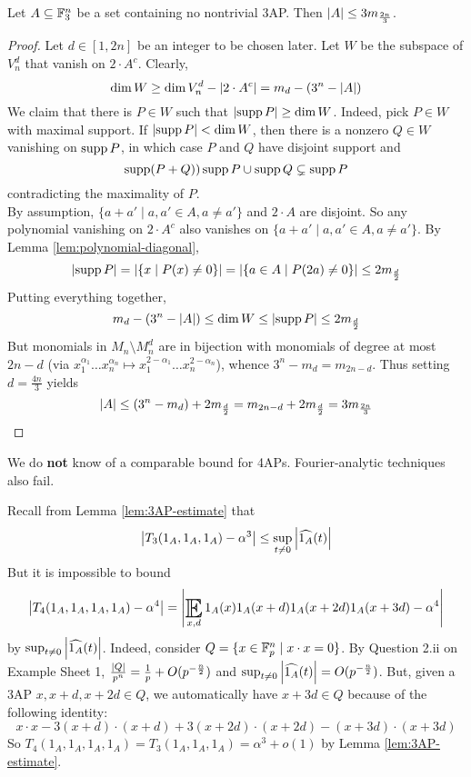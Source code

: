 \documentclass{article}
\begin{document}
\begin{prop}
  Let $A \subseteq \mathbb F_3^n$ be a set containing no nontrivial 3AP. Then $\left\lvert A\right\rvert \le 3m_{\frac{2n}3}$.
\end{prop}
\begin{proof}
  Let $d \in [1, 2n]$ be an integer to be chosen later. Let $W$ be the subspace of $V_n^d$ that vanish on $2 \cdot A^c$. Clearly,
  $$\dim W \ge \dim V_n^d - \left\lvert 2 \cdot A^c\right\rvert = m_d - (3^n - \left\lvert A\right\rvert)$$
  We claim that there is $P \in W$ such that $\left\lvert \operatorname{supp} P\right\rvert \ge \dim W$. Indeed, pick $P \in W$ with maximal support. If $\left\lvert \operatorname{supp} P\right\rvert < \dim W$, then there is a nonzero $Q \in W$ vanishing on $\operatorname{supp} P$, in which case $P$ and $Q$ have disjoint support and
  $$\operatorname{supp}(P + Q) ) \operatorname{supp} P \cup \operatorname{supp} Q \subsetneq \operatorname{supp} P$$
  contradicting the maximality of $P$. \\
  By assumption, $\{a + a' \mid a, a' \in A, a \ne a'\}$ and $2 \cdot A$ are disjoint. So any polynomial vanishing on $2 \cdot A^c$ also vanishes on $\{a + a' \mid a, a' \in A, a \ne a'\}$. By Lemma \ref{lem:polynomial-diagonal},
  $$\left\lvert \operatorname{supp} P\right\rvert = \left\lvert \{x \mid P(x) \ne 0\}\right\rvert = \left\lvert \{a \in A \mid P(2a) \ne 0\}\right\rvert \le 2m_{\frac d2}$$
  Putting everything together,
  $$m_d - (3^n - \left\lvert A\right\rvert) \le \dim W \le \left\lvert \operatorname{supp} P\right\rvert \le 2m_{\frac d2}$$
  But monomials in $M_n \setminus M_n^d$ are in bijection with monomials of degree at most $2n - d$ (via $x_1^{\alpha_1} \dots x_n^{\alpha_n} \mapsto x_1^{2 - \alpha_1} \dots x_n^{2 - \alpha_n}$), whence $3^n - m_d = m_{2n - d}$. Thus setting $d = \frac{4n}3$ yields
  $$\left\lvert A\right\rvert \le (3^n - m_d) + 2m_{\frac d2} = m_{2n - d} + 2m_{\frac d2} = 3m_{\frac{2n}3}$$
\end{proof}

We do {\bf not} know of a comparable bound for 4APs. Fourier-analytic techniques also fail.

\begin{eg}
  Recall from Lemma \ref{lem:3AP-estimate} that
  $$\left\lvert T_3(1_A, 1_A, 1_A) - \alpha^3\right\rvert \le \sup_{t \ne 0} \left\lvert \widehat{1_A}(t)\right\rvert$$
  But it is impossible to bound
  $$\abs{T_4(1_A, 1_A, 1_A, 1_A) - \alpha^4} = \abs{\E_{x, d} 1_A(x) 1_A(x + d) 1_A(x + 2d) 1_A(x + 3d) - \alpha^4}$$
  by $\sup_{t \ne 0} \left\lvert \widehat{1_A}(t)\right\rvert$. Indeed, consider $Q = \{x \in \mathbb F_p^n \mid x \cdot x = 0\}$. By Question 2.ii on Example Sheet 1, $\frac{\left\lvert Q\right\rvert}{p^n} = \frac 1p + O(p^{-\frac n2})$ and $\sup_{t \ne 0} \left\lvert \widehat{1_A}(t)\right\rvert = O(p^{-\frac n2})$. But, given a 3AP $x, x + d, x + 2d \in Q$, we automatically have $x + 3d \in Q$ because of the following identity:
  $$x \cdot x - 3(x + d) \cdot (x + d) + 3(x + 2d) \cdot (x + 2d) - (x + 3d) \cdot (x + 3d)$$
  So $T_4(1_A, 1_A, 1_A, 1_A) = T_3(1_A, 1_A, 1_A) = \alpha^3 + o(1)$ by Lemma \ref{lem:3AP-estimate}.
\end{eg}
\end{document}
